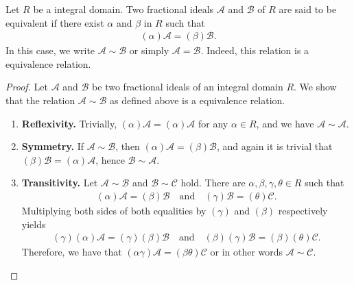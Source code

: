 \begin{defbox}
    \begin{definition}
        Let \(R\) be a integral domain. Two fractional ideals \(\mathcal{A}\) and \(\mathcal{B}\) of \(R\) are said to be equivalent if there exist \(\alpha\) and \(\beta\) in \(R\) such that
        \begin{align*}
            (\alpha) \mathcal{A} = (\beta) \mathcal{B} \text{.}
        \end{align*}
        In this case, we write \(\mathcal{A} \sim \mathcal{B}\) or simply \(\mathcal{A} = \mathcal{B}\). Indeed, this relation is a equivalence relation.
    \end{definition}
\end{defbox}
\begin{proof}
    Let \(\mathcal{A}\) and \(\mathcal{B}\) be two fractional ideals of an integral domain \(R\). We show that the relation \(\mathcal{A} \sim \mathcal{B}\) as defined above is a equivalence relation.
    \begin{enumerate}
        \item \textbf{Reflexivity.} Trivially, \((\alpha) \mathcal{A} = (\alpha) \mathcal{A}\) for any \(\alpha \in R\), and we have \(\mathcal{A} \sim \mathcal{A}\).
        \item \textbf{Symmetry.} If \(\mathcal{A} \sim \mathcal{B}\), then \((\alpha) \mathcal{A} = (\beta) \mathcal{B}\), and again it is trivial that \((\beta) \mathcal{B} = (\alpha) \mathcal{A}\), hence \(\mathcal{B} \sim \mathcal{A}\).
        \item \textbf{Transitivity.} Let \(\mathcal{A} \sim \mathcal{B}\) and \(\mathcal{B} \sim \mathcal{C}\) hold. There are \(\alpha, \beta, \gamma, \theta \in R\) such that
        \begin{align*}
            (\alpha) \mathcal{A} = (\beta) \mathcal{B} \quad \text{and} \quad (\gamma) \mathcal{B} = (\theta) \mathcal{C} \text{.}
        \end{align*}
        Multiplying both sides of both equalities by \((\gamma)\) and \((\beta)\) respectively yields
        \begin{align*}
            (\gamma) (\alpha) \mathcal{A} = (\gamma) (\beta) \mathcal{B} \quad \text{and} \quad (\beta)(\gamma) \mathcal{B} = (\beta)(\theta) \mathcal{C} \text{.}
        \end{align*}
        Therefore, we have that \((\alpha \gamma) \mathcal{A} = (\beta \theta) \mathcal{C}\) or in other words \(\mathcal{A} \sim \mathcal{C}\).
    \end{enumerate}
\end{proof}

